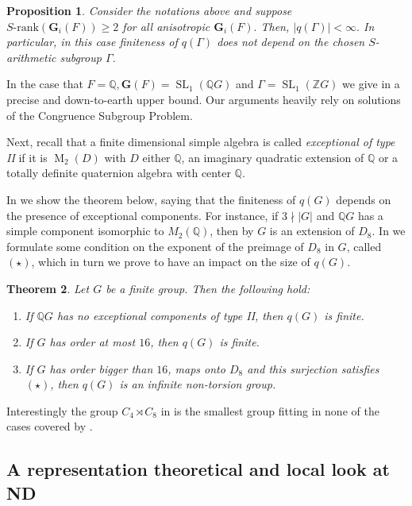 \documentclass[a4paper,10pt]{amsart}
\newtheorem{maintheorem}{Theorem}
\newtheorem{mainproposition}[maintheorem]{Proposition}
\theoremstyle{definition}
\theoremstyle{remark}
\newcommand{\SL}{\operatorname{SL}}
\newcommand{\Ma}{\operatorname{M}}
\newcommand{\Z}{{\mathbb Z}}
\newcommand{\Q}{{\mathbb Q}}
\begin{document}
\begin{mainproposition}
Consider the notations above and suppose $ S\text{-rank}(\mathbf{G}_i(F)) \geq 2$ for all anisotropic $\mathbf{G}_i(F).$ Then, $|q(\Gamma)|< \infty. $
In particular, in this case finiteness of $q(\Gamma)$ does not depend on the chosen $S$-arithmetic subgroup $\Gamma$.
\end{mainproposition}

In the case that $F= \Q, \mathbf{G}(F) = \SL_1(\Q G)$ and $\Gamma = \SL_1(\Z G)$ we give in  a precise and down-to-earth upper bound. Our arguments heavily rely on solutions of the Congruence Subgroup Problem. 

Next, recall that a finite dimensional simple algebra is called {\it exceptional of type II} if it is $\Ma_2(D)$ with $D$ either $\Q$, an imaginary quadratic extension of $\Q$ or a totally definite quaternion algebra with center $\Q$. 

In  we show the theorem below, saying that the finiteness of $q(G)$ depends on the presence of exceptional components. For instance, if $3 \nmid |G|$ and $\Q G$ has a simple component isomorphic to $M_2(\Q)$, then by \cite[Remark 6.17]{BJJKT2} $G$ is an extension of $D_8$. In  we formulate some condition on the exponent of the preimage of $D_8$ in $G$, called $(\star)$, which in turn we prove to have an impact on the size of $q(G)$. 

\begin{maintheorem}\label{theorem size qG intro}
Let $G$ be a finite group. Then the following hold:
\begin{enumerate}
\item[(i)]  If $\Q G$ has no exceptional components of type II, then $q(G)$ is finite.
\item[(ii)] If $G$ has order at most $16$, then $q(G)$ is finite.
\item[(iii)] If $G$ has order bigger than $16$, maps onto $D_8$ and this surjection satisfies $(\star)$, then $q(G)$ is an infinite non-torsion group.
\end{enumerate}
\end{maintheorem}
 Interestingly the group $C_4 \rtimes C_8$ in  is the smallest group fitting in none of the cases covered by . 


\subsection*{A representation theoretical and local look at ND}
\end{document}
